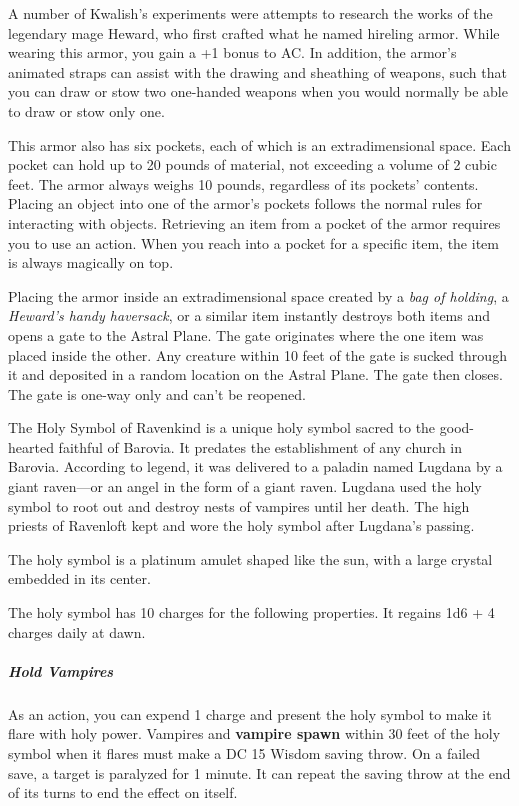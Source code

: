 \documentclass[10pt,a4paper,twoside,bg=print,twocolumn,openany,nodeprecatedcode]{dndbook}
\begin{document}
A number of Kwalish's experiments were attempts to research the works of the legendary mage Heward, who first crafted what he named hireling armor. While wearing this armor, you gain a +1 bonus to AC. In addition, the armor's animated straps can assist with the drawing and sheathing of weapons, such that you can draw or stow two one-handed weapons when you would normally be able to draw or stow only one.

This armor also has six pockets, each of which is an extradimensional space. Each pocket can hold up to 20 pounds of material, not exceeding a volume of 2 cubic feet. The armor always weighs 10 pounds, regardless of its pockets' contents. Placing an object into one of the armor's pockets follows the normal rules for interacting with objects. Retrieving an item from a pocket of the armor requires you to use an action. When you reach into a pocket for a specific item, the item is always magically on top.

Placing the armor inside an extradimensional space created by a \textit{bag of holding}, a \textit{Heward's handy haversack}, or a similar item instantly destroys both items and opens a gate to the Astral Plane. The gate originates where the one item was placed inside the other. Any creature within 10 feet of the gate is sucked through it and deposited in a random location on the Astral Plane. The gate then closes. The gate is one-way only and can't be reopened.

The Holy Symbol of Ravenkind is a unique holy symbol sacred to the good-hearted faithful of Barovia. It predates the establishment of any church in Barovia. According to legend, it was delivered to a paladin named Lugdana by a giant raven—or an angel in the form of a giant raven. Lugdana used the holy symbol to root out and destroy nests of vampires until her death. The high priests of Ravenloft kept and wore the holy symbol after Lugdana's passing.

The holy symbol is a platinum amulet shaped like the sun, with a large crystal embedded in its center.

The holy symbol has 10 charges for the following properties. It regains 1d6 + 4 charges daily at dawn.

\subparagraph{Hold Vampires}
As an action, you can expend 1 charge and present the holy symbol to make it flare with holy power. Vampires and \textbf{vampire spawn} within 30 feet of the holy symbol when it flares must make a DC 15 Wisdom saving throw. On a failed save, a target is paralyzed for 1 minute. It can repeat the saving throw at the end of its turns to end the effect on itself.
\end{document}
